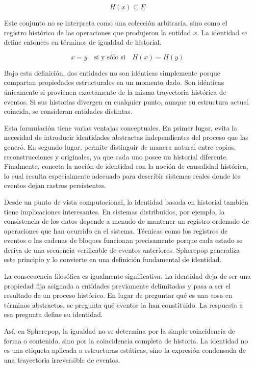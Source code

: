 \documentclass[12pt]{article}
\begin{document}
\[
H(x) \subseteq E
\]

Este conjunto no se interpreta como una colección arbitraria, sino como el registro histórico de las operaciones que produjeron la entidad \(x\). La identidad se define entonces en términos de igualdad de historial.

\[
x = y \quad \text{si y sólo si} \quad H(x) = H(y)
\]

Bajo esta definición, dos entidades no son idénticas simplemente porque compartan propiedades estructurales en un momento dado. Son idénticas únicamente si provienen exactamente de la misma trayectoria histórica de eventos. Si sus historias divergen en cualquier punto, aunque su estructura actual coincida, se consideran entidades distintas.

Esta formulación tiene varias ventajas conceptuales. En primer lugar, evita la necesidad de introducir identidades abstractas independientes del proceso que las generó. En segundo lugar, permite distinguir de manera natural entre copias, reconstrucciones y originales, ya que cada uno posee un historial diferente. Finalmente, conecta la noción de identidad con la noción de causalidad histórica, lo cual resulta especialmente adecuado para describir sistemas reales donde los eventos dejan rastros persistentes.

Desde un punto de vista computacional, la identidad basada en historial también tiene implicaciones interesantes. En sistemas distribuidos, por ejemplo, la consistencia de los datos depende a menudo de mantener un registro ordenado de operaciones que han ocurrido en el sistema. Técnicas como los registros de eventos o las cadenas de bloques funcionan precisamente porque cada estado se deriva de una secuencia verificable de eventos anteriores. Spherepop generaliza este principio y lo convierte en una definición fundamental de identidad.

La consecuencia filosófica es igualmente significativa. La identidad deja de ser una propiedad fija asignada a entidades previamente delimitadas y pasa a ser el resultado de un proceso histórico. En lugar de preguntar qué es una cosa en términos abstractos, se pregunta qué eventos la han constituido. La respuesta a esa pregunta define su identidad.

Así, en Spherepop, la igualdad no se determina por la simple coincidencia de forma o contenido, sino por la coincidencia completa de historia. La identidad no es una etiqueta aplicada a estructuras estáticas, sino la expresión condensada de una trayectoria irreversible de eventos.
\end{document}
